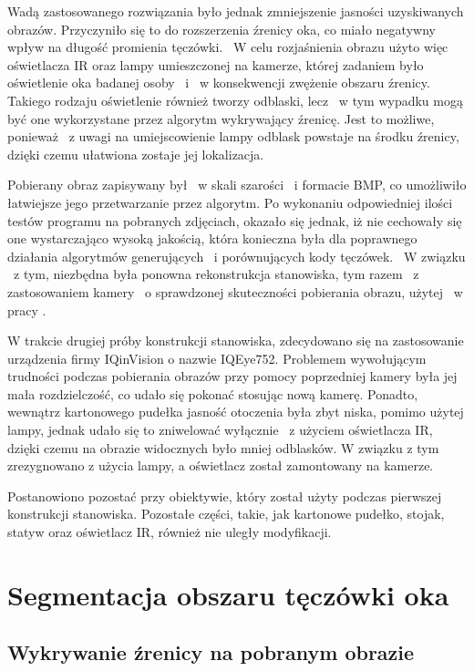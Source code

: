 Wadą zastosowanego rozwiązania było jednak zmniejszenie jasności uzyskiwanych obrazów. Przyczyniło się to do rozszerzenia źrenicy oka, co miało negatywny wpływ na długość promienia tęczówki. ~W celu rozjaśnienia obrazu użyto więc oświetlacza IR oraz lampy umieszczonej na kamerze, której zadaniem było oświetlenie oka badanej osoby ~i ~w konsekwencji zwężenie obszaru źrenicy. Takiego rodzaju oświetlenie również tworzy odblaski, lecz ~w tym wypadku mogą być one wykorzystane przez algorytm wykrywający źrenicę. Jest to możliwe, ponieważ ~z uwagi na umiejscowienie lampy odblask powstaje na środku źrenicy, dzięki czemu ułatwiona zostaje jej lokalizacja.

Pobierany obraz zapisywany był ~w skali szarości ~i formacie BMP, co umożliwiło łatwiejsze jego przetwarzanie przez algorytm. Po wykonaniu odpowiedniej ilości testów programu na pobranych zdjęciach, okazało się jednak, iż nie cechowały się one wystarczająco wysoką jakością, która konieczna była dla poprawnego działania algorytmów generujących ~i porównujących kody tęczówek. ~W związku ~z tym, niezbędna była ponowna rekonstrukcja stanowiska, tym razem ~z zastosowaniem kamery ~o sprawdzonej skuteczności pobierania obrazu, użytej ~w pracy \cite{Gl11}.

W trakcie drugiej próby konstrukcji stanowiska, zdecydowano się na zastosowanie urządzenia firmy IQinVision o nazwie IQEye752. Problemem wywołującym trudności podczas pobierania obrazów przy pomocy poprzedniej kamery była jej mała rozdzielczość, co udało się pokonać stosując nową kamerę. Ponadto, wewnątrz kartonowego pudełka jasność otoczenia była zbyt niska, pomimo użytej lampy, jednak udało się to zniwelować wyłącznie ~z użyciem oświetlacza IR, dzięki czemu na obrazie widocznych było mniej odblasków. W związku z tym zrezygnowano z użycia lampy, a oświetlacz został zamontowany na kamerze.

Postanowiono pozostać przy obiektywie, który został użyty podczas pierwszej konstrukcji stanowiska. Pozostałe części, takie, jak kartonowe pudełko, stojak, statyw oraz oświetlacz IR, również nie uległy modyfikacji.

\section{Segmentacja obszaru tęczówki oka}
\subsection{Wykrywanie źrenicy na pobranym obrazie}
\label{sec:wykrycieZrenicy}

